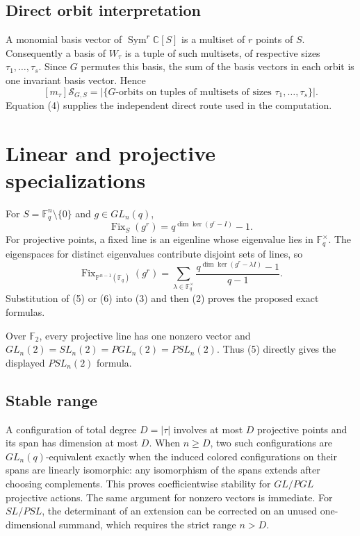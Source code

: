 \documentclass[10pt]{article}
\newcommand{\Sym}{\operatorname{Sym}}
\newcommand{\Fix}{\operatorname{Fix}}
\newcommand{\F}{\mathbb F}
\newcommand{\Sg}{\mathcal S}
\begin{document}
\subsection*{Direct orbit interpretation}
A monomial basis vector of $\Sym^r\mathbb C[S]$ is a multiset of $r$ points
of $S$.  Consequently a basis of $W_\tau$ is a tuple of such multisets, of
respective sizes $\tau_1,\ldots,\tau_s$.  Since $G$ permutes this basis, the
sum of the basis vectors in each orbit is one invariant basis vector.  Hence
\begin{equation}
 \boxed{[m_\tau]\Sg_{G,S}=\left|\{G\text{-orbits on tuples of multisets of
 sizes }\tau_1,\ldots,\tau_s\}\right|.}
\end{equation}
Equation (4) supplies the independent direct route used in the computation.

\section{Linear and projective specializations}
For $S=\F_q^n\setminus\{0\}$ and $g\in GL_n(q)$,
\begin{equation}
 \Fix_S(g^r)=q^{\dim\ker(g^r-I)}-1.
\end{equation}
For projective points, a fixed line is an eigenline whose eigenvalue lies in
$\F_q^\times$.  The eigenspaces for distinct eigenvalues contribute disjoint
sets of lines, so
\begin{equation}
 \Fix_{\mathbb P^{n-1}(\F_q)}(g^r)=
 \sum_{\lambda\in\F_q^\times}
 \frac{q^{\dim\ker(g^r-\lambda I)}-1}{q-1}.
\end{equation}
Substitution of (5) or (6) into (3) and then (2) proves the proposed exact
formulas.

Over $\F_2$, every projective line has one nonzero vector and
$GL_n(2)=SL_n(2)=PGL_n(2)=PSL_n(2)$.  Thus (5) directly gives the displayed
$PSL_n(2)$ formula.

\subsection*{Stable range}
A configuration of total degree $D=|\tau|$ involves at most $D$ projective
points and its span has dimension at most $D$.  When $n\geq D$, two such
configurations are $GL_n(q)$-equivalent exactly when the induced colored
configurations on their spans are linearly isomorphic: any isomorphism of the
spans extends after choosing complements.  This proves coefficientwise
stability for $GL/PGL$ projective actions.  The same argument for nonzero
vectors is immediate.  For $SL/PSL$, the determinant of an extension can be
corrected on an unused one-dimensional summand, which requires the strict
range $n>D$.
\end{document}
